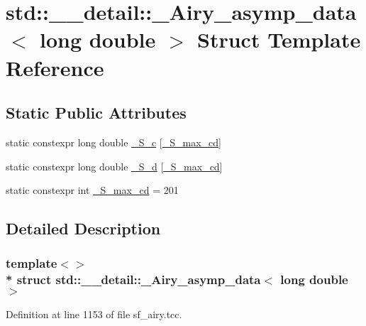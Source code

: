 \hypertarget{structstd_1_1____detail_1_1__Airy__asymp__data_3_01long_01double_01_4}{}\section{std\+:\+:\+\_\+\+\_\+detail\+:\+:\+\_\+\+Airy\+\_\+asymp\+\_\+data$<$ long double $>$ Struct Template Reference}
\label{structstd_1_1____detail_1_1__Airy__asymp__data_3_01long_01double_01_4}
\subsection*{Static Public Attributes}
\begin{DoxyCompactItemize}
\item 
static constexpr long double \hyperlink{structstd_1_1____detail_1_1__Airy__asymp__data_3_01long_01double_01_4_a563bbe7d1ef612defb41aaedcc5657fe}{\+\_\+\+S\+\_\+c} \mbox{[}\hyperlink{structstd_1_1____detail_1_1__Airy__asymp__data_3_01long_01double_01_4_a6a21ac69ffc53d33ebc346981bc52b9a}{\+\_\+\+S\+\_\+max\+\_\+cd}\mbox{]}
\item 
static constexpr long double \hyperlink{structstd_1_1____detail_1_1__Airy__asymp__data_3_01long_01double_01_4_a3c49ca222e675f3def5077e46c7d6834}{\+\_\+\+S\+\_\+d} \mbox{[}\hyperlink{structstd_1_1____detail_1_1__Airy__asymp__data_3_01long_01double_01_4_a6a21ac69ffc53d33ebc346981bc52b9a}{\+\_\+\+S\+\_\+max\+\_\+cd}\mbox{]}
\item 
static constexpr int \hyperlink{structstd_1_1____detail_1_1__Airy__asymp__data_3_01long_01double_01_4_a6a21ac69ffc53d33ebc346981bc52b9a}{\+\_\+\+S\+\_\+max\+\_\+cd} = 201
\end{DoxyCompactItemize}


\subsection{Detailed Description}
\subsubsection*{template$<$$>$\\*
struct std\+::\+\_\+\+\_\+detail\+::\+\_\+\+Airy\+\_\+asymp\+\_\+data$<$ long double $>$}



Definition at line 1153 of file sf\+\_\+airy.\+tcc.




